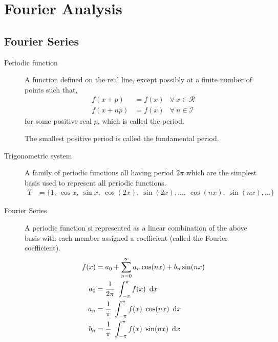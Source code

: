 \chapter{Fourier Analysis}

\section{Fourier Series}

\begin{description}
    \item[Periodic function] A function defined on the real line, except possibly at a
        finite number of points such that,
        \begin{align}
            f(x + p)  & = f(x) & \forall\ x \in \mathcal{R} \\
            f(x + np) & =f(x)  & \forall\ n \in \mathcal{I}
        \end{align}
        for some positive real $ p $, which is called the period. \par
        The smallest positive period is called the fundamental period.

    \item[Trigonometric system] A family of periodic functions all having period $ 2\pi $
        which are the simplest basis used to represent all periodic functions.
        \begin{align}
            T & = \{1,\ \cos x,\ \sin x,\ \cos(2x),\ \sin(2x), \dots,\ \cos(nx),
            \ \sin(nx), \dots\}
        \end{align}

    \item[Fourier Series] A periodic function si represented as a linear combination of
        the above basis with each member assigned a coefficient (called the Fourier
        coefficient).
        \begin{align}
            f(x) & = a_0 + \iser[n]{0} a_n \cos(nx) + b_n \sin(nx)          \\
            a_0  & = \frac{1}{2\pi}\ \int_{-\pi}^{\pi} f(x)\ \dl x          \\
            a_n  & = \frac{1}{\pi}\ \int_{-\pi}^{\pi} f(x)\ \cos(nx)\ \dl x \\
            b_n  & = \frac{1}{\pi}\ \int_{-\pi}^{\pi} f(x)\ \sin(nx)\ \dl x
        \end{align}


\end{description}
